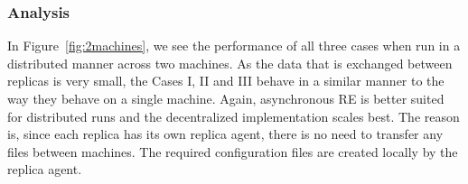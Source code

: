 \documentclass[a4paper,10pt]{article}
\newcommand{\athotanote}[1]{ {\textcolor{green} { ***athota: #1 }}}
\newcommand{\athotanote}[1]{}
\begin{document}
\subsubsection{Analysis}
In Figure~\ref{fig:2machines}, we see the performance of all three cases when run in a distributed manner across two machines. As the data that is exchanged between replicas is very small, the Cases I, II and III behave in a similar manner to the way they behave on a single machine. Again, asynchronous RE is better suited for distributed runs and the decentralized implementation scales best. The reason is, since each replica has its own replica agent, there is no need to transfer any files between machines. The required configuration files are created locally by the replica agent.


\end{document}
